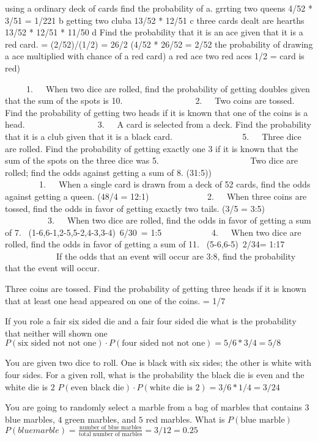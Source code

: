 \begin{ExerciseList}
\Exercise using a ordinary deck of cards find the probability of
a. grrting two queens 4/52 * 3/51 = 1/221
b getting two cluba 13/52 * 12/51
c three cards dealt are hearths 13/52 * 12/51 * 11/50
d Find the probability that it is an ace given that it is a red card. = (2/52)/(1/2) = 26/2 (4/52 * 26/52 = 2/52 the probability of drawing a ace multiplied with chance of a red card) a red ace two red aces 1/2 = card is red)

     1.   When two dice are rolled, find the probability of getting doubles given that the sum of the spots is 10.      
     
     2.   Two coins are tossed. Find the probability of getting two heads if it is known that one of the coins is a head.      
     
     3.   A card is selected from a deck. Find the probability that it is a club given that it is a black card.
     
          5.   Three dice are rolled. Find the probability of getting exactly one 3 if it is known that the sum of the spots on the three dice was 5.
          
          Two dice are rolled; find the odds against getting a sum of 8. (31:5))
          
        1.   When a single card is drawn from a deck of 52 cards, find the odds against getting a queen. (48/4 = 12:1)    
         2.   When three coins are tossed, find the odds in favor of getting exactly two tails. (3/5 = 3:5)     
          3.   When two dice are rolled, find the odds in favor of getting a sum of 7.  (1-6,6-1,2-5,5-2,4-3,3-4) 6/30 = 1:5
           4.   When two dice are rolled, find the odds in favor of getting a sum of 11.  (5-6,6-5) 2/34= 1:17
            If the odds that an event will occur are 3:8, find the probability that the event will occur. 
                

\Exercise
Three coins are tossed. Find the probability of getting three heads if it is known that at least one head appeared on one of the coins. = 1/7

\Exercise If you role a fair six sided die and a fair four sided die what is the probability that neither will shown one
\Answer $P(\text{six sided not not one}) \cdot P(\text{four sided not not one}) = 5/6 * 3/4 = 5/8$

\Exercise You are given two dice to roll. One is black with six sides; the other is white with four sides. For a given roll, what is the probability the black die is even and the white die is $2$
\Answer $P(\text{even black die}) \cdot P(\text{white die is 2}) = 3/6 * 1/4 = 3/24$

\Exercise You are going to randomly select a marble from a bag of marbles that contains $3$ blue marbles, $4$ green marbles, and $5$ red marbles. What is $P(\text{blue marble})$
\Answer $P(blue marble) = \frac{\text{number of blue marbles}}{\text{total number of marbles}} = 3/12 = 0.25$


\end{ExerciseList}
